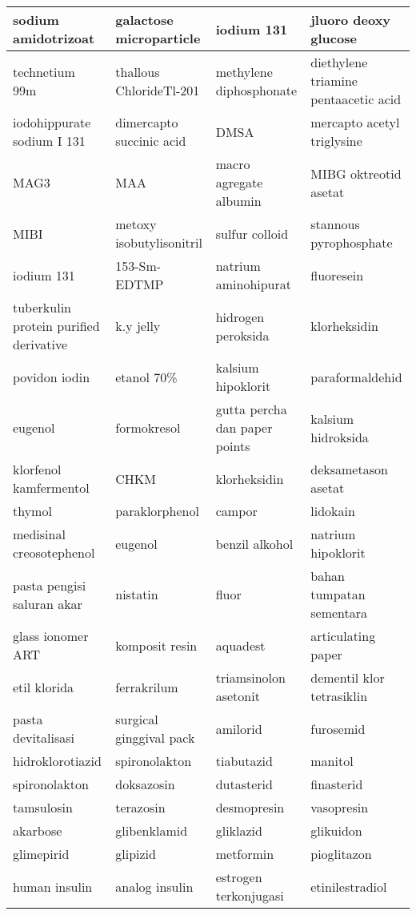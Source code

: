 \begin{longtable}{|p{}|p{}|p{}|p{}|}
	sodium amidotrizoat & galactose microparticle & iodium 131 & jluoro deoxy glucose \\ \hline
	technetium 99m & thallous ChlorideTl-201 & methylene diphosphonate & diethylene triamine pentaacetic acid \\ \hline
	iodohippurate sodium I 131 & dimercapto succinic acid & DMSA & mercapto acetyl triglysine \\ \hline
	MAG3 & MAA & macro agregate albumin & MIBG oktreotid asetat \\ \hline
	MIBI & metoxy isobutylisonitril & sulfur colloid & stannous pyrophosphate \\ \hline
	iodium 131 & 153-Sm-EDTMP & natrium aminohipurat & fluoresein \\ \hline
	tuberkulin protein purified derivative & k.y jelly & hidrogen peroksida & klorheksidin \\ \hline
	povidon iodin & etanol 70\% & kalsium hipoklorit & paraformaldehid \\ \hline
	eugenol & formokresol & gutta percha dan paper points & kalsium hidroksida \\ \hline
	klorfenol kamfermentol & CHKM & klorheksidin & deksametason asetat \\ \hline
	thymol & paraklorphenol & campor & lidokain \\ \hline
	medisinal creosotephenol & eugenol & benzil alkohol & natrium hipoklorit \\ \hline
	pasta pengisi saluran akar & nistatin & fluor & bahan tumpatan sementara \\ \hline
	glass ionomer ART & komposit resin & aquadest & articulating paper \\ \hline
	etil klorida & ferrakrilum & triamsinolon asetonit & dementil klor tetrasiklin \\ \hline
	pasta devitalisasi & surgical ginggival pack & amilorid & furosemid \\ \hline
	hidroklorotiazid & spironolakton & tiabutazid & manitol \\ \hline
	spironolakton & doksazosin & dutasterid & finasterid \\ \hline
	tamsulosin & terazosin & desmopresin & vasopresin \\ \hline
	akarbose & glibenklamid & gliklazid & glikuidon \\ \hline
	glimepirid & glipizid & metformin & pioglitazon \\ \hline
	human insulin & analog insulin & estrogen terkonjugasi & etinilestradiol \\ \hline

\end{longtable}
